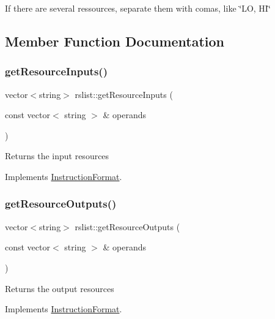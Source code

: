 If there are several ressources, separate them with comas, like \char`\"{}\+L\+O, H\+I\char`\"{} 

\subsection{Member Function Documentation}
\mbox{\label{classrslist_aecc14cc02c8e8e7cc6f1ac2989083bda}} 
\subsubsection{\texorpdfstring{get\+Resource\+Inputs()}{getResourceInputs()}}
{\footnotesize\ttfamily vector$<$string$>$ rslist\+::get\+Resource\+Inputs (\begin{DoxyParamCaption}\item[{const vector$<$ string $>$ \&}]{operands }\end{DoxyParamCaption})\hspace{0.3cm}{\ttfamily [virtual]}}

Returns the input resources 

Implements \hyperlink{classInstructionFormat_a09775d3a3c22f40a0f44504664e586e4}{Instruction\+Format}.

\mbox{\label{classrslist_adc1bf6be9d82f0a616fc374023d8a636}} 
\subsubsection{\texorpdfstring{get\+Resource\+Outputs()}{getResourceOutputs()}}
{\footnotesize\ttfamily vector$<$string$>$ rslist\+::get\+Resource\+Outputs (\begin{DoxyParamCaption}\item[{const vector$<$ string $>$ \&}]{operands }\end{DoxyParamCaption})\hspace{0.3cm}{\ttfamily [virtual]}}

Returns the output resources 

Implements \hyperlink{classInstructionFormat_a95cd28ffb1bde59b67f676880ab10536}{Instruction\+Format}.

\mbox{\label{classrslist_aaa2d2aa941041c08369254f21e8846b7}} 
